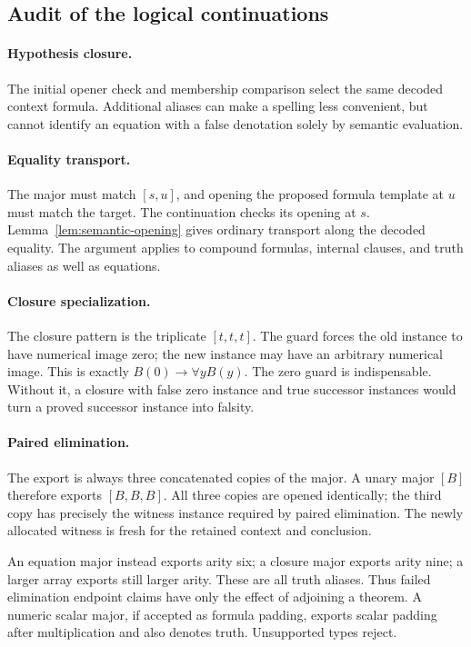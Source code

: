 \documentclass[11pt,letterpaper]{article}
\theoremstyle{definition}
\theoremstyle{remark}
\begin{document}
\subsection{Audit of the logical continuations}
\label{subsec:logical-audit}

\paragraph{Hypothesis closure.}
The initial opener check and membership comparison select the same
decoded context formula.  Additional aliases can make a spelling less
convenient, but cannot identify an equation with a false denotation
solely by semantic evaluation.

\paragraph{Equality transport.}
The major must match $[s,u]$, and opening the proposed formula template
at $u$ must match the target.  The continuation checks its opening at
$s$.  Lemma~\ref{lem:semantic-opening} gives ordinary transport along
the decoded equality.  The argument applies to compound formulas,
internal clauses, and truth aliases as well as equations.

\paragraph{Closure specialization.}
The closure pattern is the triplicate $[t,t,t]$.  The guard forces the
old instance to have numerical image zero; the new instance may have
an arbitrary numerical image.  This is exactly
$B(0)\to\forall yB(y)$.  The zero guard is indispensable.  Without
it, a closure with false zero instance and true successor instances
would turn a proved successor instance into falsity.

\paragraph{Paired elimination.}
The export is always three concatenated copies of the major.  A unary
major $[B]$ therefore exports $[B,B,B]$.  All three copies are opened
identically; the third copy has precisely the witness instance required
by paired elimination.  The newly allocated witness is fresh for the
retained context and conclusion.

An equation major instead exports arity six; a closure major exports
arity nine; a larger array exports still larger arity.  These are all
truth aliases.  Thus failed elimination endpoint claims have only the
effect of adjoining a theorem.  A numeric scalar major, if accepted as
formula padding, exports scalar padding after multiplication and also
denotes truth.  Unsupported types reject.
\end{document}
